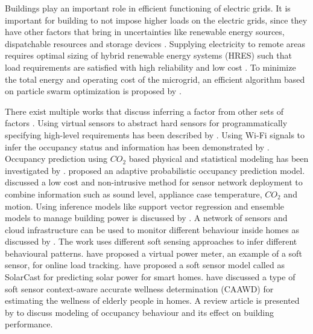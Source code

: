 \documentclass[]{interact}
\theoremstyle{plain}%
\theoremstyle{definition}
\theoremstyle{remark}
\begin{document}

Buildings play an important role in efficient functioning of electric grids. 
It is important for building to not impose higher loads on the electric grids, since they have other factors that bring in uncertainties like renewable energy sources, dispatchable resources and storage devices \citep{tf_pricing}.
Supplying electricity to remote areas requires optimal sizing of hybrid renewable energy systems (HRES) such that load requirements are satisfied with high reliability and low cost \citep{tf_renewable}. 
To minimize the total energy and operating cost of the microgrid, an efficient algorithm based on particle swarm optimization is proposed by \cite{tf_swarm}.  


There exist multiple works that discuss inferring a factor from other sets of factors \citep{anshuleEnergy16, balaji}.   
Using virtual sensors to abstract hard sensors for programmatically specifying high-level requirements has been described by \cite{virtual_senors}.   
Using Wi-Fi signals to infer the occupancy status and information has been demonstrated by \cite{occupancy_wifi, softgreen}.
Occupancy prediction using $CO_2$ based physical and statistical modeling has been investigated by \cite{elsevier_co2}. 
\cite{elsevier_occ_realtime}  proposed an adaptive probabilistic occupancy prediction model.
\cite{brown_fan}  discussed a low cost and non-intrusive method for sensor network deployment to combine information such as sound level, appliance case temperature, $CO_2$ and motion.
Using inference models like support vector regression and ensemble models to manage building power is discussed by \cite{tcps_bellala}.  
A network of sensors and cloud infrastructure can be used to monitor different behaviour inside homes as discussed by \cite{sensors_cloud_behaviour}. 
The work uses different soft sensing approaches to infer different behavioural patterns.
 \cite{tcps_virtualpowermeter} have proposed a virtual power meter, an example of a soft sensor, for online load tracking.  
\cite{tcps_solarcast} have proposed a soft sensor model called as SolarCast for predicting solar power for smart homes.  
\cite{sensors_caawd} have discussed a type of soft sensor {context-aware accurate	wellness determination (CAAWD)} for estimating the wellness of elderly people in homes. 
A review article  is presented by \cite{scs_ob} to discuss modeling of occupancy behaviour and its effect on building performance.
\end{document}
